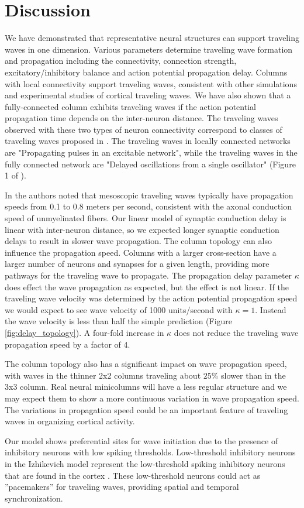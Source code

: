 \documentclass[a4paper,11pt]{article}
\begin{document}
\section{Discussion}
We have demonstrated that representative neural structures can support traveling waves in one dimension.
Various parameters determine traveling wave formation and propagation including the connectivity, connection strength, excitatory/inhibitory balance and action potential propagation delay.
Columns with local connectivity support traveling waves, consistent with other simulations and experimental studies of cortical traveling waves.
We have also shown that  a fully-connected column exhibits traveling waves if the action potential propagation time depends on the inter-neuron distance. 
The traveling waves observed with these two types of neuron connectivity correspond to classes of traveling waves proposed in \cite{ermentrout2001}.
The traveling waves in locally connected networks are "Propagating pulses in an excitable network", while the traveling waves in the fully connected network are "Delayed oscillations from a single oscillator" (Figure 1 of \cite{ermentrout2001}).

In \cite{muller2018} the authors noted that mesoscopic traveling waves typically have propagation speeds from 0.1 to 0.8 meters per second, consistent with the axonal conduction speed of unmyelinated fibers.
Our linear model of synaptic conduction delay is linear with inter-neuron distance, so we expected longer synaptic conduction delays to result in slower wave propagation.
The column topology can also influence the propagation speed.
Columns with a larger cross-section have a larger number of neurons and synapses for a given length, providing more pathways for the traveling wave to propagate.
The propagation delay parameter $\kappa$ does effect the wave propagation as expected, but the effect is not linear.
If the traveling wave velocity was determined by the action potential propagation speed we would expect to see wave velocity of 1000 units/second with $\kappa=1$.
Instead the wave velocity is less than half the simple prediction (Figure \ref{fig:delay_topology}).
A four-fold increase in $\kappa$ does not reduce the traveling wave propagation speed by a factor of 4. 

The column topology also has a significant impact on wave propagation speed, with waves in the thinner 2x2 columns traveling about $25\%$ slower than in the 3x3 column.
Real neural minicolumns will have a less regular structure and we may expect them to show a more continuous variation in wave propagation speed. 
The variations in propagation speed could be an important feature of traveling waves in organizing cortical activity.

Our model shows preferential sites for wave initiation due to the presence of inhibitory neurons with low spiking thresholds.
Low-threshold inhibitory neurons in the Izhikevich model represent the low-threshold spiking inhibitory neurons that are found in the cortex \cite{izhikevich2003}\cite{gibson2009}.
These low-threshold neurons could act as ''pacemakers'' for traveling waves, providing spatial and temporal synchronization.

\clearpage
\printbibliography
\end{document}

